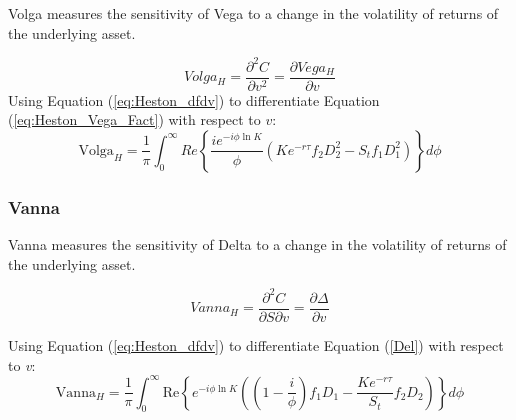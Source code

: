\documentclass[a4paper]{article}
\begin{document}
Volga measures the sensitivity of Vega to a change in the volatility of returns of the underlying asset.

\begin{equation*}
	Volga_H = \frac{\partial^2 C}{\partial v^2} = \frac{\partial Vega_H}{\partial v}
\end{equation*}
Using Equation (\ref{eq:Heston_dfdv}) to differentiate Equation (\ref{eq:Heston_Vega_Fact}) with respect to $\textit{v}$:
\begin{equation}
	\mbox{Volga}_H = \frac{1}{\pi}\int_0^\infty Re \left\{ \frac{ie^{-i\phi \ln K}}{\phi} \left(  Ke^{-r\tau}f_2D_2^2 - S_tf_1D_1^2 \right) \right\} d\phi
\end{equation}

\subsubsection*{Vanna}

Vanna measures the sensitivity of Delta to a change in the volatility of returns of the underlying asset.

\[Vanna_H = \frac{\partial^2C}{\partial S \partial v}= \frac{\partial \Delta}{\partial v} \]

Using Equation (\ref{eq:Heston_dfdv}) to differentiate Equation (\ref{Del}) with respect to \textit{v}:
\begin{equation}
	\mbox{Vanna}_H = \frac{1}{\pi}\int_0^\infty \mbox{Re}\left\{e^{-i \phi \ln K} \left(\left(1-\frac{i}{\phi}\right) f_1D_1-\frac{K e^{-r\tau}}{S_t}f_2D_2\right)\right\}d \phi
\end{equation}































	
\end{document}
